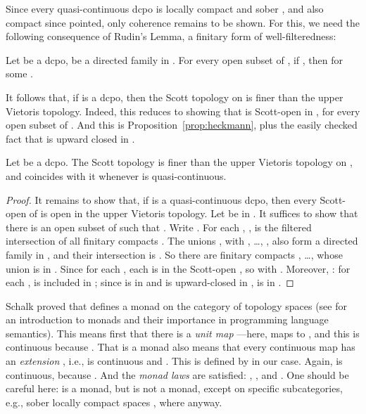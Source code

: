 \documentclass{LMCS}
\begin{document}
Since every quasi-continuous dcpo is locally compact and sober
\cite[Proposition~III-3.7]{GHKLMS:contlatt}, and also compact since
pointed, only coherence remains to be shown.  For this, we need the
following consequence of Rudin's Lemma, a finitary form of
well-filteredness:
\begin{prop}
  \label{prop:heckmann}
  Let  be a dcpo,  be a directed family in
  .  For every open subset  of , if , then 
  for some .
\end{prop}

It follows that, if  is a dcpo, then the Scott topology on  is finer than the upper Vietoris topology.  Indeed, this reduces
to showing that  is Scott-open in ,
for every open subset  of .  And this is
Proposition~\ref{prop:heckmann}, plus the easily checked fact that
 is upward closed in .
\begin{cor} \label{corl:BoxU}
  Let  be a dcpo.  The Scott topology is finer than the upper
  Vietoris topology on , and coincides with it whenever 
  is quasi-continuous.
\end{cor}
\begin{proof}
  It remains to show that, if  is a quasi-continuous dcpo, then
  every Scott-open  of  is open in the upper
  Vietoris topology.  Let  be in .
  It suffices to show that there is an open subset  of  such
  that .  Write .  For each , ,  is the
  filtered intersection of all finitary compacts .
  The unions , with , \ldots, , also form a directed family in , and their
  intersection is .  So there are finitary compacts , \ldots,  whose union is in .  Since  for each , each  is in the
  Scott-open , so  with .  Moreover, : for each ,  is included in
  ; since  is in  and  is
  upward-closed in ,  is in .  \end{proof}

Schalk \cite[Chapter~7]{Schalk:PhD} proved that  defines a monad
on the category of topology spaces (see \cite{Mog91} for an
introduction to monads and their importance in programming language
semantics).  This means first that there is a {\em unit map\/}
---here,  maps  to , and
this is continuous because .  That  is
a monad also means that every continuous map  has
an {\em extension\/} , i.e.,
 is continuous and .  This is
defined by  in our case.
Again,  is continuous, because .  And the {\em monad laws\/} are satisfied:
, ,
and .  One
should be careful here:  is a monad, but  is not a
monad, except on specific subcategories, e.g., sober locally compact
spaces , where  anyway.
\end{document}
